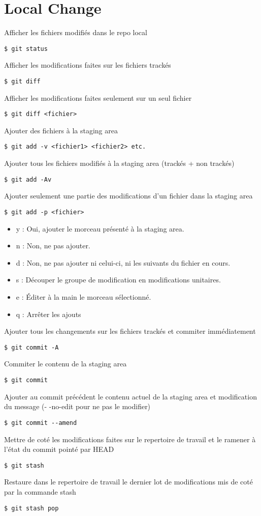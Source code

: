 \section*{Local Change}

Afficher les fichiers modifiés dans le repo local
\begin{lstlisting}
$ git status
\end{lstlisting}
Afficher les modifications faites sur les fichiers trackés
\begin{lstlisting}
$ git diff
\end{lstlisting}
Afficher les modifications faites seulement sur un seul fichier
\begin{lstlisting}
$ git diff <fichier>
\end{lstlisting}
Ajouter des fichiers à la staging area
\begin{lstlisting}
$ git add -v <fichier1> <fichier2> etc.
\end{lstlisting}
Ajouter tous les fichiers modifiés à la staging area (trackés + non trackés)
\begin{lstlisting}
$ git add -Av 
\end{lstlisting}
Ajouter seulement une partie des modifications d'un fichier dans la staging area
\begin{lstlisting}
$ git add -p <fichier>
\end{lstlisting}
\begin{itemize}
	\item y : Oui, ajouter le morceau présenté à la staging area.
	\item n : Non, ne pas ajouter.
	\item d : Non, ne pas ajouter ni celui-ci, ni les suivants du fichier en cours.
	\item s : Découper le groupe de modification en modifications unitaires.
	\item e : Éditer à la main le morceau sélectionné.
	\item q : Arrêter les ajouts
\end{itemize}
Ajouter tous les changements sur les fichiers trackés et commiter immédiatement
\begin{lstlisting}
$ git commit -A
\end{lstlisting}
Commiter le contenu de la staging area
\begin{lstlisting}
$ git commit 
\end{lstlisting}
Ajouter au commit précédent le contenu actuel de la staging area et modification du message (- -no-edit pour ne pas le modifier)
\begin{lstlisting}
$ git commit --amend
\end{lstlisting}
Mettre de coté les modifications faites sur le repertoire de travail et le ramener à l'état du commit pointé par HEAD
\begin{lstlisting}
$ git stash
\end{lstlisting}
Restaure dans le repertoire de travail le dernier lot de modifications mis de coté par la commande stash
\begin{lstlisting}
$ git stash pop
\end{lstlisting}